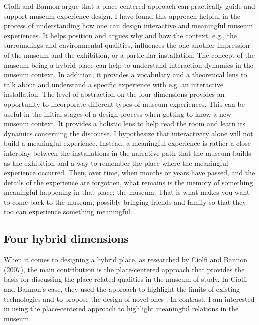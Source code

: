 Ciolfi and Bannon argue that a place-centered approach can practically guide and support museum experience design. I have found this approach helpful in the process of understanding how one can design interactive and meaningful museum experiences. It helps position and argues why and how the context, e.g., the surroundings and environmental qualities, influences the one-another impression of the museum and the exhibition, or a particular installation. The concept of the museum being a hybrid place can help to understand interaction dynamics in the museum context. In addition, it provides a vocabulary and a theoretical lens to talk about and understand a specific experience with e.g. an interactive installation. The level of abstraction on the four dimensions provides an opportunity to incorporate different types of museum experiences. This can be useful in the initial stages of a design process when getting to know a new museum context. It provides a holistic lens to help read the room and learn its dynamics concerning the discourse. I hypothesize that interactivity alone will not build a meaningful experience. Instead, a meaningful experience is rather a close interplay between the installations in the narrative path that the museum builds as the exhibition and a way to remember the place where the meaningful experience occurred. Then, over time, when months or years have passed, and the details of the experience are forgotten, what remains is the memory of something meaningful happening in that place; the museum. That is what makes you want to come back to the museum, possibly bringing friends and family so that they too can experience something meaningful.


\subsection{Four hybrid dimensions}
When it comes to designing a hybrid place, as researched by Ciolfi and Bannon (2007), the main contribution is the place-centered approach that provides the basis for discussing the place-related qualities in the museum of study. In Ciolfi and Bannon's case, they used the approach to highlight the limits of existing technologies and to propose the design of novel ones \autocite[p. 163]{hybridplace_ciolfi}. In contrast, I am interested in using the place-centered approach to highlight meaningful relations in the museum.

